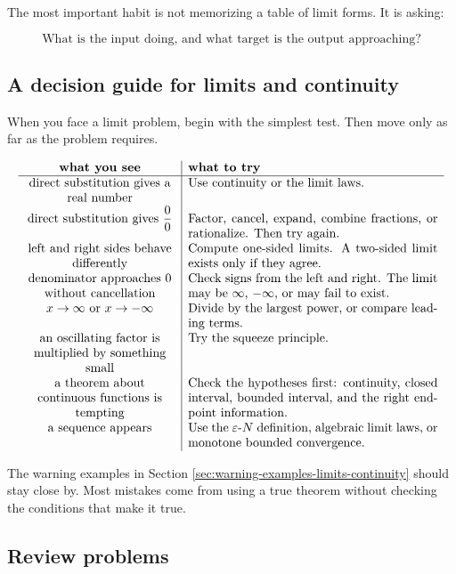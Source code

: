 The most important habit is not memorizing a table of limit forms.  It is asking:

\[
\text{What is the input doing, and what target is the output approaching?}
\]

\subsection{A decision guide for limits and continuity}
\label{subsec:chapter3-decision-guide}

When you face a limit problem, begin with the simplest test.  Then move only as far as the problem requires.

\[
\begin{array}{>{\centering\arraybackslash}p{0.35\textwidth}|p{0.58\textwidth}}
\textbf{what you see} & \textbf{what to try} \\ \hline
direct substitution gives a real number &
Use continuity or the limit laws. \\[4pt]
direct substitution gives \(\dfrac00\) &
Factor, cancel, expand, combine fractions, or rationalize.  Then try again. \\[8pt]
left and right sides behave differently &
Compute one-sided limits.  A two-sided limit exists only if they agree. \\[6pt]
denominator approaches \(0\) without cancellation &
Check signs from the left and right.  The limit may be \(\infty\), \(-\infty\), or may fail to exist. \\[6pt]
\(x\to\infty\) or \(x\to-\infty\) &
Divide by the largest power, or compare leading terms. \\[6pt]
an oscillating factor is multiplied by something small &
Try the squeeze principle. \\[6pt]
a theorem about continuous functions is tempting &
Check the hypotheses first: continuity, closed interval, bounded interval, and the right endpoint information. \\[6pt]
a sequence appears &
Use the \(\varepsilon\)-\(N\) definition, algebraic limit laws, or monotone bounded convergence.
\end{array}
\]

The warning examples in Section \ref{sec:warning-examples-limits-continuity} should stay close by.  Most mistakes come from using a true theorem without checking the conditions that make it true.

\subsection{Review problems}
\label{subsec:chapter3-review-problems}

